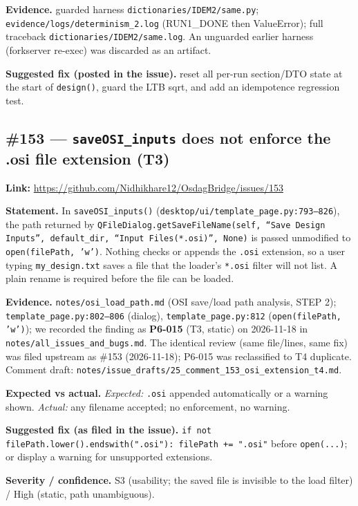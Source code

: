 \textbf{Evidence.} guarded harness \texttt{dictionaries/IDEM2/same.py}; \texttt{evidence/logs/determinism\_2.log} (RUN1\_DONE then ValueError); full traceback \texttt{dictionaries/IDEM2/same.log}. An unguarded earlier harness (forkserver re-exec) was discarded as an artifact.

\textbf{Suggested fix (posted in the issue).} reset all per-run section/DTO state at the start of \texttt{design()}, guard the LTB sqrt, and add an idempotence regression test.

\subsection{\#153 --- \texttt{saveOSI\_inputs} does not enforce the .osi file extension (T3)}
\textbf{Link:} \url{https://github.com/Nidhikhare12/OsdagBridge/issues/153}

\textbf{Statement.} In \texttt{saveOSI\_inputs()} (\texttt{desktop/ui/template\_page.py:793--826}), the path returned by \texttt{QFileDialog.getSaveFileName(self, ``Save Design Inputs'', default\_dir, ``Input Files(*.osi)'', None)} is passed unmodified to \texttt{open(filePath, 'w')}. Nothing checks or appends the \texttt{.osi} extension, so a user typing \texttt{my\_design.txt} saves a file that the loader's \texttt{*.osi} filter will not list. A plain rename is required before the file can be loaded.

\textbf{Evidence.} \texttt{notes/osi\_load\_path.md} (OSI save/load path analysis, STEP 2); \texttt{template\_page.py:802--806} (dialog), \texttt{template\_page.py:812} (\texttt{open(filePath, 'w')}); we recorded the finding as \textbf{P6-015} (T3, static) on 2026-11-18 in \texttt{notes/all\_issues\_and\_bugs.md}. The identical review (same file/lines, same fix) was filed upstream as \#153 (2026-11-18); P6-015 was reclassified to T4 duplicate. Comment draft: \texttt{notes/issue\_drafts/25\_comment\_153\_osi\_extension\_t4.md}.

\textbf{Expected vs actual.} \emph{Expected:} \texttt{.osi} appended automatically or a warning shown. \emph{Actual:} any filename accepted; no enforcement, no warning.

\textbf{Suggested fix (as filed in the issue).} \texttt{if not filePath.lower().endswith(".osi"): filePath += ".osi"} before \texttt{open(...)}; or display a warning for unsupported extensions.

\textbf{Severity / confidence.} S3 (usability; the saved file is invisible to the load filter) / High (static, path unambiguous).

